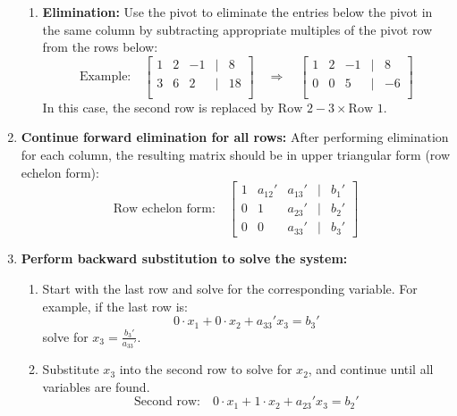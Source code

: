 \begin{process}
\begin{enumerate}
\begin{enumerate}
            \item \textbf{Elimination:} Use the pivot to eliminate the entries below the pivot in the same column by subtracting appropriate multiples of the pivot row from the rows below:
            \[
            \text{Example:} \quad \begin{bmatrix}
            1 & 2 & -1 & | & 8 \\
            3 & 6 & 2 & | & 18 \\
            \end{bmatrix}
            \quad \Rightarrow \quad \begin{bmatrix}
            1 & 2 & -1 & | & 8 \\
            0 & 0 & 5 & | & -6 \\
            \end{bmatrix}
            \]
            In this case, the second row is replaced by \( \text{Row 2} - 3 \times \text{Row 1} \).
        \end{enumerate}
    
        \item \textbf{Continue forward elimination for all rows:} After performing elimination for each column, the resulting matrix should be in upper triangular form (row echelon form):
        \[
        \text{Row echelon form:} \quad \begin{bmatrix}
        1 & a_{12}' & a_{13}' & | & b_1' \\
        0 & 1 & a_{23}' & | & b_2' \\
        0 & 0 & a_{33}' & | & b_3'
        \end{bmatrix}
        \]
    
        \item \textbf{Perform backward substitution to solve the system:}
        \begin{enumerate}
            \item Start with the last row and solve for the corresponding variable. For example, if the last row is:
            \[
            0 \cdot x_1 + 0 \cdot x_2 + a_{33}' x_3 = b_3'
            \]
            solve for \( x_3 = \frac{b_3'}{a_{33}'} \).
            
            \item Substitute \( x_3 \) into the second row to solve for \( x_2 \), and continue until all variables are found.
            \[
            \text{Second row:} \quad 0 \cdot x_1 + 1 \cdot x_2 + a_{23}' x_3 = b_2'
            \]
        \end{enumerate}
    

\end{enumerate}
\end{process}
